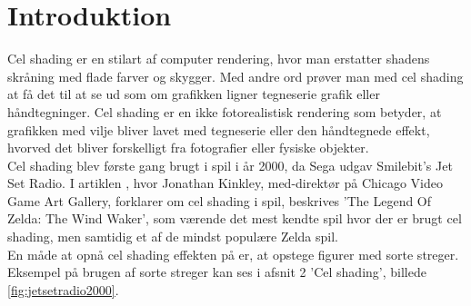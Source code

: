 \newpage
\section{Introduktion}
\setcounter{page}{1}
Cel shading er en stilart af computer rendering, hvor man erstatter shadens skråning med flade farver og skygger. Med andre ord prøver man med cel shading at få det til at se ud som om grafikken ligner tegneserie grafik eller håndtegninger. Cel shading er en ikke fotorealistisk rendering som betyder, at grafikken med vilje bliver lavet med tegneserie eller den håndtegnede effekt, hvorved det bliver forskelligt fra fotografier eller fysiske objekter. \\
Cel shading blev første gang brugt i spil i år 2000, da Sega udgav  Smilebit's Jet Set Radio\cite{tvtropes}. I artiklen \cite{kinkley2016}, hvor Jonathan Kinkley, med-direktør på Chicago Video Game Art Gallery, forklarer om cel shading i spil, beskrives ’The Legend Of Zelda: The Wind Waker', som værende det mest kendte spil hvor der er brugt cel shading, men samtidig et af de mindst populære Zelda spil.
\\
En måde at opnå cel shading effekten på er, at opstege figurer med sorte streger. Eksempel på brugen af sorte streger kan ses i afsnit 2 'Cel shading', billede \ref{fig:jetsetradio2000}.